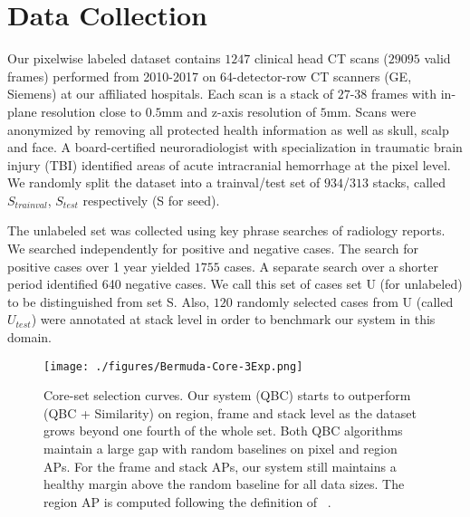 \documentclass{llncs}
\begin{document}
\section{Data Collection}
\vspace*{-0.2cm}
\label{sect:data}
Our pixelwise labeled dataset contains $1247$ clinical head CT scans ($29095$ valid frames) performed from 2010-2017 on 64-detector-row CT scanners (GE, Siemens) at our affiliated hospitals. %
Each scan is a stack of $27$-$38$ frames with in-plane resolution close to $0.5$mm and z-axis resolution of $5$mm. Scans were anonymized by removing all protected health information as well as skull, scalp and face.
A board-certified neuroradiologist with specialization in traumatic brain injury (TBI) identified areas of acute intracranial hemorrhage at the pixel level.
We randomly split the dataset into a trainval/test set of $934$/$313$ stacks, called $S_{trainval}$, $S_{test}$ respectively (S for seed).

The unlabeled set was collected using key phrase searches of radiology reports. We searched independently for positive and negative cases. The search for positive cases over 1 year yielded $1755$ cases. A separate search over a shorter period identified 640 negative cases. We call this set of cases set U (for unlabeled) to be distinguished from set S. Also, $120$ randomly selected cases from U (called $U_{test}$) were annotated at stack level in order to benchmark our system in this domain.  %

\begin{figure}[t]
    \centering
    \texttt{[image: ./figures/Bermuda-Core-3Exp.png]}
    \caption{Core-set selection curves. Our system (QBC) starts to outperform ~\cite{yang2017suggestive} (QBC + Similarity) on region, frame and stack level as the dataset grows beyond one fourth of the whole set. Both QBC algorithms maintain a large gap with random baselines on pixel and region APs. For the frame and stack APs, our system still maintains a healthy margin above the random baseline for all data sizes. The region AP is computed following the definition of ~\cite{arxiv2018PatchFCN}.}
    \label{fig:core-set}
    \vspace*{-0.3cm}
\end{figure}
\end{document}
